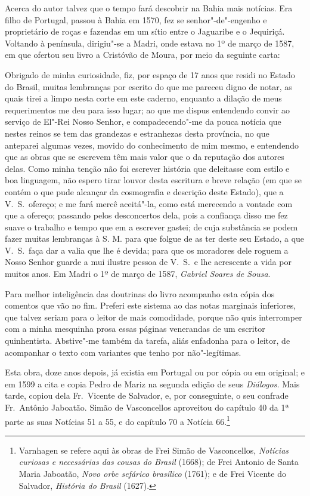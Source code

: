 \begin{linenumbers}
Acerca do autor talvez que o tempo fará descobrir na Bahia mais 
notícias. Era filho de Portugal, passou à Bahia em 1570, fez 
se senhor"-de"-engenho e proprietário de roças e fazendas em um sítio 
entre o Jaguaribe e o Jequiriçá. Voltando à península, dirigiu"-se a 
Madri, onde estava no 1º de março de 1587, em que ofertou seu livro a 
Cristóvão de Moura, por meio da seguinte carta: 
\begin{hedraquote}
Obrigado de minha curiosidade, fiz, por espaço de 17 anos que 
residi no Estado do Brasil, muitas lembranças por escrito do que me 
pareceu digno de notar, as quais tirei a limpo nesta corte em este 
caderno, enquanto a dilação de meus requerimentos me deu para isso 
lugar; ao que me dispus entendendo convir ao serviço de El"-Rei Nosso 
Senhor, e compadecendo"-me da pouca notícia que nestes reinos se tem 
das grandezas e estranhezas desta província, no que anteparei algumas 
vezes, movido do conhecimento de mim mesmo, e entendendo que as 
obras que se escrevem têm mais valor que o da reputação dos autores 
delas. Como minha tenção não foi escrever história que deleitasse com 
estilo e boa linguagem, não espero tirar louvor desta escritura e breve 
relação (em que se contém o que pude alcançar da cosmografia e 
descrição deste Estado), que a V.~S.~ofereço; e me fará mercê aceitá"-la, 
como está merecendo a vontade com que a ofereço; passando pelos 
desconcertos dela, pois a confiança disso me fez suave o trabalho e 
tempo que em a escrever gastei; de cuja substância se podem fazer 
muitas lembranças à S. M. para que folgue de as ter deste seu Estado, a 
que V.~S.~faça dar a valia que lhe é devida; para que os moradores dele 
roguem a Nosso Senhor guarde a mui ilustre pessoa de V.~S.~e lhe acrescente a 
vida por muitos anos. Em Madri o 1º de março de 1587, \textit{Gabriel Soares de Sousa}. 
\end{hedraquote}

Para melhor inteligência das doutrinas do livro acompanho esta 
cópia dos comentos que vão no fim. Preferi este sistema ao das notas 
marginais inferiores, que talvez seriam para o leitor de mais 
comodidade, porque não quis interromper com a minha mesquinha 
prosa essas páginas venerandas de um escritor quinhentista. Abstive"-me 
também da tarefa, aliás enfadonha para o leitor, de acompanhar o texto 
com variantes que tenho por não"-legítimas. 

Esta obra, doze anos depois, já existia em Portugal ou por cópia ou 
em original; e em 1599 a cita e copia Pedro de Mariz na segunda edição 
de seus \textit{Diálogos.} Mais tarde, copiou dela Fr.~Vicente de Salvador, e, 
por conseguinte, o seu confrade Fr.~Antônio Jaboatão. Simão de 
Vasconcellos aproveitou do capítulo 40 da 1ª parte as suas Notícias 51 a 
55, e do capítulo 70 a Notícia 66.\footnote{ Varnhagen se refere aqui às obras de Frei 
Simão de Vasconcellos, \textit{Notícias curiosas e necessárias das cousas do Brasil} (1668); de 
Frei Antonio de Santa Maria Jaboatão, \textit{ Novo orbe sefárico brasílico} (1761); e de 
Frei Vicente do Salvador, \textit{ História do Brasil} (1627).}  


\end{linenumbers}
